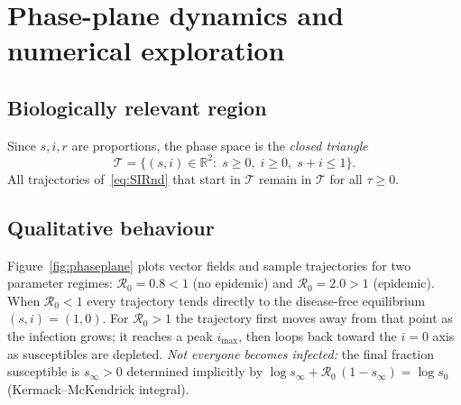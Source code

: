 \documentclass[11pt]{article}
\newcommand{\R}{\mathbb{R}}
\newcommand{\RR}{\mathcal{R}_0}
\begin{document}
\section{Phase-plane dynamics and numerical exploration}
\label{sec:PhasePlane}

\subsection*{Biologically relevant region}
Since $s,i,r$ are proportions, the phase space is the
\emph{closed triangle}
\[
\mathcal T=\{(s,i)\in\R^2:\; s\ge0,\; i\ge0,\; s+i\le1\}.
\]
All trajectories of~\cref{eq:SIRnd} that start in $\mathcal T$
remain in $\mathcal T$ for all $\tau\ge0$.

\subsection*{Qualitative behaviour}
Figure~\cref{fig:phaseplane} plots vector fields and sample trajectories
for two parameter regimes:
$\RR=0.8<1$ (no epidemic) and $\RR=2.0>1$ (epidemic).
When $\RR<1$ every trajectory tends directly to the
disease-free equilibrium $(s,i)=(1,0)$.
For $\RR>1$ the trajectory first moves away from that point
as the infection grows; it reaches a peak $i_{\max}$, then
loops back toward the $i=0$ axis as susceptibles are depleted.
\emph{Not everyone becomes infected:} the final fraction susceptible
is $s_{\infty}>0$ determined implicitly by
\(\log s_{\infty} + \RR\,(1-s_{\infty})=\log s_{0}\)
(Kermack–McKendrick integral).

\end{document}
